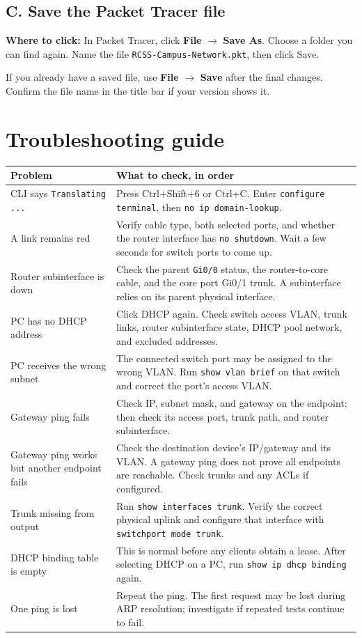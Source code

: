\documentclass[11pt,a4paper]{article}
\newcommand{\clickpath}[1]{\noindent\colorbox{noteBG}{\parbox{0.96\linewidth}{\textbf{Where to click:} #1}}\par\vspace{5pt}}
\begin{document}
\subsection*{C. Save the Packet Tracer file}
\clickpath{In Packet Tracer, click \textbf{File} \(\rightarrow\) \textbf{Save As}. Choose a folder you can find again. Name the file \texttt{RCSS-Campus-Network.pkt}, then click Save.}
If you already have a saved file, use \textbf{File} \(\rightarrow\) \textbf{Save} after the final changes. Confirm the file name in the title bar if your version shows it.

\section{Troubleshooting guide}\label{sec:trouble}
\begin{longtable}{@{}p{}p{}@{}}
\toprule
Problem & What to check, in order\\
\midrule
CLI says \texttt{Translating ...} & Press Ctrl+Shift+6 or Ctrl+C. Enter \texttt{configure terminal}, then \texttt{no ip domain-lookup}.\\
A link remains red & Verify cable type, both selected ports, and whether the router interface has \texttt{no shutdown}. Wait a few seconds for switch ports to come up.\\
Router subinterface is down & Check the parent \texttt{Gi0/0} status, the router-to-core cable, and the core port Gi0/1 trunk. A subinterface relies on its parent physical interface.\\
PC has no DHCP address & Click DHCP again. Check switch access VLAN, trunk links, router subinterface state, DHCP pool network, and excluded addresses.\\
PC receives the wrong subnet & The connected switch port may be assigned to the wrong VLAN. Run \texttt{show vlan brief} on that switch and correct the port's access VLAN.\\
Gateway ping fails & Check IP, subnet mask, and gateway on the endpoint; then check its access port, trunk path, and router subinterface.\\
Gateway ping works but another endpoint fails & Check the destination device's IP/gateway and its VLAN. A gateway ping does not prove all endpoints are reachable. Check trunks and any ACLs if configured.\\
Trunk missing from output & Run \texttt{show interfaces trunk}. Verify the correct physical uplink and configure that interface with \texttt{switchport mode trunk}.\\
DHCP binding table is empty & This is normal before any clients obtain a lease. After selecting DHCP on a PC, run \texttt{show ip dhcp binding} again.\\
One ping is lost & Repeat the ping. The first request may be lost during ARP resolution; investigate if repeated tests continue to fail.\\
\bottomrule
\end{longtable}
\end{document}
